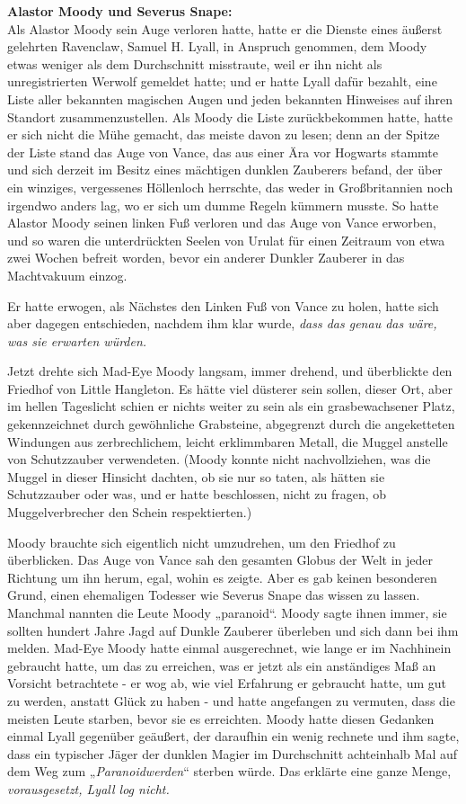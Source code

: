 {\textbf{Alastor Moody und Severus Snape:}\\ Als Alastor Moody sein Auge verloren hatte, hatte er die Dienste eines äußerst gelehrten Ravenclaw, Samuel H. Lyall, in Anspruch genommen, dem Moody etwas weniger als dem Durchschnitt misstraute, weil er ihn nicht als unregistrierten Werwolf gemeldet hatte; und er hatte Lyall dafür bezahlt, eine Liste aller bekannten magischen Augen und jeden bekannten Hinweises auf ihren Standort zusammenzustellen. Als Moody die Liste zurückbekommen hatte, hatte er sich nicht die Mühe gemacht, das meiste davon zu lesen; denn an der Spitze der Liste stand das Auge von Vance, das aus einer Ära vor Hogwarts stammte und sich derzeit im Besitz eines mächtigen dunklen Zauberers befand, der über ein winziges, vergessenes Höllenloch herrschte, das weder in Großbritannien noch irgendwo anders lag, wo er sich um dumme Regeln kümmern musste. So hatte Alastor Moody seinen linken Fuß verloren und das Auge von Vance erworben, und so waren die unterdrückten Seelen von Urulat für einen Zeitraum von etwa zwei Wochen befreit worden, bevor ein anderer Dunkler Zauberer in das Machtvakuum einzog.

Er hatte erwogen, als Nächstes den Linken Fuß von Vance zu holen, hatte sich aber dagegen entschieden, nachdem ihm klar wurde, \emph{dass das genau das wäre, was sie erwarten würden.}

Jetzt drehte sich Mad-Eye Moody langsam, immer drehend, und überblickte den Friedhof von Little Hangleton. Es hätte viel düsterer sein sollen, dieser Ort, aber im hellen Tageslicht schien er nichts weiter zu sein als ein grasbewachsener Platz, gekennzeichnet durch gewöhnliche Grabsteine, abgegrenzt durch die angeketteten Windungen aus zerbrechlichem, leicht erklimmbaren Metall, die Muggel anstelle von Schutzzauber verwendeten. (Moody konnte nicht nachvollziehen, was die Muggel in dieser Hinsicht dachten, ob sie nur so taten, als hätten sie Schutzzauber oder was, und er hatte beschlossen, nicht zu fragen, ob Muggelverbrecher den Schein respektierten.)

Moody brauchte sich eigentlich nicht umzudrehen, um den Friedhof zu überblicken. Das Auge von Vance sah den gesamten Globus der Welt in jeder Richtung um ihn herum, egal, wohin es zeigte. Aber es gab keinen besonderen Grund, einen ehemaligen Todesser wie Severus Snape das wissen zu lassen. Manchmal nannten die Leute Moody „paranoid“. Moody sagte ihnen immer, sie sollten hundert Jahre Jagd auf Dunkle Zauberer überleben und sich dann bei ihm melden. Mad-Eye Moody hatte einmal ausgerechnet, wie lange er im Nachhinein gebraucht hatte, um das zu erreichen, was er jetzt als ein anständiges Maß an Vorsicht betrachtete - er wog ab, wie viel Erfahrung er gebraucht hatte, um gut zu werden, anstatt Glück zu haben - und hatte angefangen zu vermuten, dass die meisten Leute starben, bevor sie es erreichten. Moody hatte diesen Gedanken einmal Lyall gegenüber geäußert, der daraufhin ein wenig rechnete und ihm sagte, dass ein typischer Jäger der dunklen Magier im Durchschnitt achteinhalb Mal auf dem Weg zum „\emph{Paranoidwerden}“ sterben würde. Das erklärte eine ganze Menge, \emph{vorausgesetzt, Lyall log nicht.}

}
